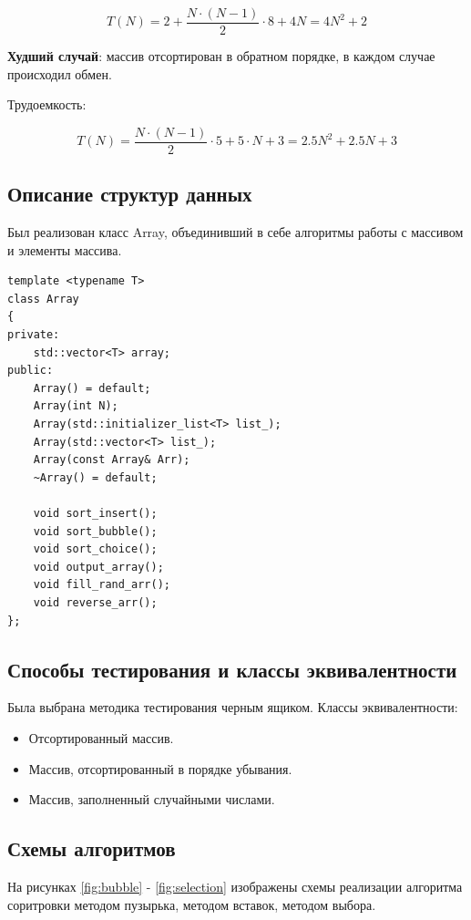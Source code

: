 \documentclass[14pt,russian]{scrartcl}
\begin{document}
\begin{equation}
    T(N) = 2 + \frac{N \cdot (N - 1)}{2} \cdot 8 + 4N = 4N^2 + 2
\end{equation}

\textbf{Худший случай}: массив отсортирован в обратном порядке, в каждом случае происходил обмен.

Трудоемкость:

\begin{equation}
    T(N) = \frac{N \cdot (N - 1)}{2} \cdot 5 + 5 \cdot N + 3 = 2.5N^2 + 2.5N + 3
\end{equation}
\subsection{Описание структур данных}
Был реализован класс Array, объединивший в себе алгоритмы работы с массивом и элементы массива.
\begin{lstlisting}[caption=Описание класса Array, label=list:canon, language={}]
template <typename T>
class Array
{
private:
	std::vector<T> array;
public:
	Array() = default;
	Array(int N);
	Array(std::initializer_list<T> list_);
	Array(std::vector<T> list_);
	Array(const Array& Arr);
	~Array() = default;

	void sort_insert();
	void sort_bubble();
	void sort_choice();
	void output_array();
	void fill_rand_arr();
	void reverse_arr();
};
\end{lstlisting}

\subsection{Способы тестирования и классы эквивалентности}
Была выбрана методика тестирования черным ящиком. 
Классы эквивалентности:
\begin{itemize}
	\item Отсортированный массив.
	\item Массив, отсортированный в порядке убывания.
	\item Массив, заполненный случайными числами.
\end{itemize}

\subsection{Схемы алгоритмов}

На рисунках \ref{fig:bubble} - \ref{fig:selection} изображены схемы реализации алгоритма соритровки методом пузырька, методом вставок, методом выбора.
\end{document}
